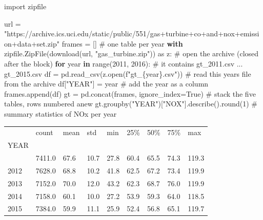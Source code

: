 \documentclass[
  letterpaper,
  DIV=11,
  numbers=noendperiod]{scrreprt}
\newenvironment{Shaded}{\begin{snugshade}}{\end{snugshade}}
\newcommand{\BuiltInTok}[1]{\textcolor[rgb]{0.00,0.23,0.31}{#1}}
\newcommand{\CommentTok}[1]{\textcolor[rgb]{0.37,0.37,0.37}{#1}}
\newcommand{\ControlFlowTok}[1]{\textcolor[rgb]{0.00,0.23,0.31}{\textbf{#1}}}
\newcommand{\DecValTok}[1]{\textcolor[rgb]{0.68,0.00,0.00}{#1}}
\newcommand{\ImportTok}[1]{\textcolor[rgb]{0.00,0.46,0.62}{#1}}
\newcommand{\KeywordTok}[1]{\textcolor[rgb]{0.00,0.23,0.31}{\textbf{#1}}}
\newcommand{\NormalTok}[1]{\textcolor[rgb]{0.00,0.23,0.31}{#1}}
\newcommand{\OperatorTok}[1]{\textcolor[rgb]{0.37,0.37,0.37}{#1}}
\newcommand{\SpecialCharTok}[1]{\textcolor[rgb]{0.37,0.37,0.37}{#1}}
\newcommand{\SpecialStringTok}[1]{\textcolor[rgb]{0.13,0.47,0.30}{#1}}
\newcommand{\StringTok}[1]{\textcolor[rgb]{0.13,0.47,0.30}{#1}}
\newcommand{\VariableTok}[1]{\textcolor[rgb]{0.07,0.07,0.07}{#1}}
\begin{document}
\begin{Shaded}
\begin{Highlighting}[]
\ImportTok{import}\NormalTok{ zipfile}

\NormalTok{url }\OperatorTok{=} \StringTok{"https://archive.ics.uci.edu/static/public/551/gas+turbine+co+and+nox+emission+data+set.zip"}
\NormalTok{frames }\OperatorTok{=}\NormalTok{ []                                                   }\CommentTok{\# one table per year}
\ControlFlowTok{with}\NormalTok{ zipfile.ZipFile(download(url, }\StringTok{"gas\_turbine.zip"}\NormalTok{)) }\ImportTok{as}\NormalTok{ z:  }\CommentTok{\# open the archive (closed after the block)}
    \ControlFlowTok{for}\NormalTok{ year }\KeywordTok{in} \BuiltInTok{range}\NormalTok{(}\DecValTok{2011}\NormalTok{, }\DecValTok{2016}\NormalTok{):                            }\CommentTok{\# it contains gt\_2011.csv ... gt\_2015.csv}
\NormalTok{        df }\OperatorTok{=}\NormalTok{ pd.read\_csv(z.}\BuiltInTok{open}\NormalTok{(}\SpecialStringTok{f"gt\_}\SpecialCharTok{\{}\NormalTok{year}\SpecialCharTok{\}}\SpecialStringTok{.csv"}\NormalTok{))            }\CommentTok{\# read this year\textquotesingle{}s file from the archive}
\NormalTok{        df[}\StringTok{"YEAR"}\NormalTok{] }\OperatorTok{=}\NormalTok{ year                                     }\CommentTok{\# add the year as a column}
\NormalTok{        frames.append(df)}
\NormalTok{gt }\OperatorTok{=}\NormalTok{ pd.concat(frames, ignore\_index}\OperatorTok{=}\VariableTok{True}\NormalTok{)                     }\CommentTok{\# stack the five tables, rows numbered anew}
\NormalTok{gt.groupby(}\StringTok{"YEAR"}\NormalTok{)[}\StringTok{"NOX"}\NormalTok{].describe().}\BuiltInTok{round}\NormalTok{(}\DecValTok{1}\NormalTok{)                 }\CommentTok{\# summary statistics of NOx per year}
\end{Highlighting}
\end{Shaded}

\begin{longtable}[]{@{}lllllllll@{}}
\toprule\noalign{}
& count & mean & std & min & 25\% & 50\% & 75\% & max \\
YEAR & & & & & & & & \\
\midrule\noalign{}
\endhead
\bottomrule\noalign{}
\endlastfoot
2011 & 7411.0 & 67.6 & 10.7 & 27.8 & 60.4 & 65.5 & 74.3 & 119.3 \\
2012 & 7628.0 & 68.8 & 10.2 & 41.8 & 62.5 & 67.2 & 73.4 & 119.9 \\
2013 & 7152.0 & 70.0 & 12.0 & 43.2 & 62.3 & 68.7 & 76.0 & 119.9 \\
2014 & 7158.0 & 60.1 & 10.0 & 27.2 & 53.9 & 59.3 & 64.0 & 118.5 \\
2015 & 7384.0 & 59.9 & 11.1 & 25.9 & 52.4 & 56.8 & 65.1 & 119.7 \\
\end{longtable}
\end{document}
